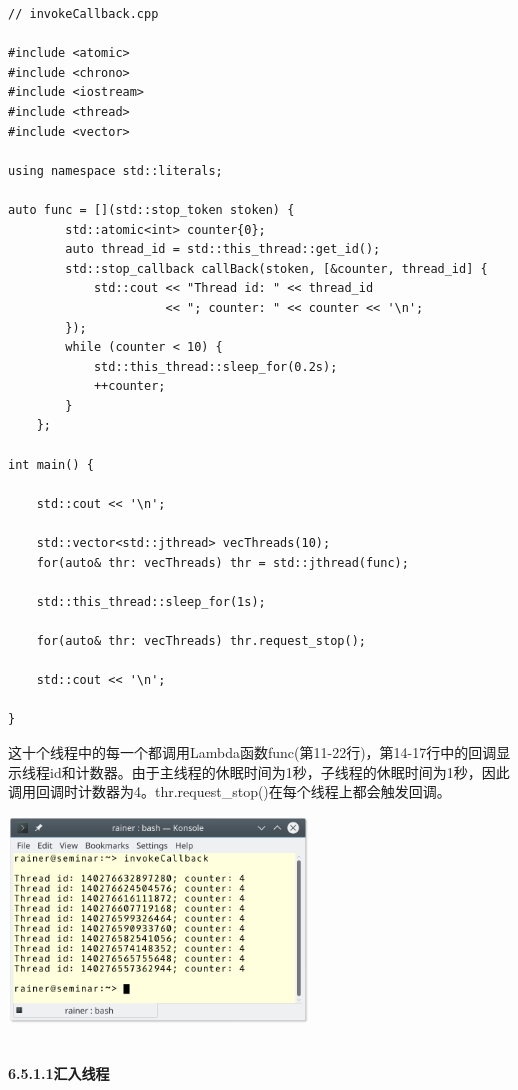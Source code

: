 \begin{lstlisting}[style=styleCXX]
// invokeCallback.cpp

#include <atomic>
#include <chrono>
#include <iostream>
#include <thread>
#include <vector>

using namespace std::literals;

auto func = [](std::stop_token stoken) {
		std::atomic<int> counter{0};
		auto thread_id = std::this_thread::get_id();
		std::stop_callback callBack(stoken, [&counter, thread_id] {
			std::cout << "Thread id: " << thread_id
					  << "; counter: " << counter << '\n';
		});
		while (counter < 10) {
			std::this_thread::sleep_for(0.2s);
			++counter;
		}
	};

int main() {

	std::cout << '\n';
	
	std::vector<std::jthread> vecThreads(10);
	for(auto& thr: vecThreads) thr = std::jthread(func);
	
	std::this_thread::sleep_for(1s);
	
	for(auto& thr: vecThreads) thr.request_stop();
	
	std::cout << '\n';

}
\end{lstlisting}

这十个线程中的每一个都调用Lambda函数func(第11-22行)，第14-17行中的回调显示线程id和计数器。由于主线程的休眠时间为1秒，子线程的休眠时间为1秒，因此调用回调时计数器为4。thr.request\_stop()在每个线程上都会触发回调。

\begin{center}
\includegraphics[width=0.6\textwidth]{content/3/chapter6/images/23.png}\\
\end{center}

\hspace*{\fill} \\ %
\noindent
\textbf{6.5.1.1\hspace{0.2cm}汇入线程}

